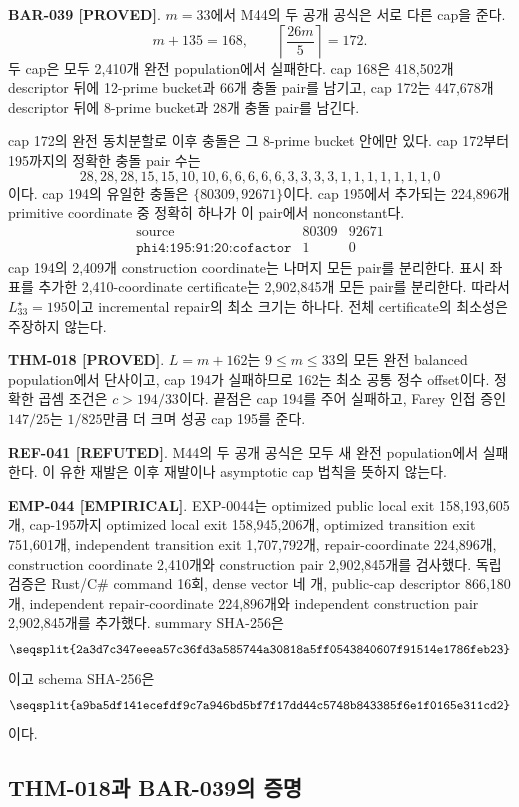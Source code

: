 \documentclass[11pt]{article}
\newcommand{\claimstatus}[2]{\textbf{#1 [#2]}}
\begin{document}
\claimstatus{BAR-039}{PROVED}.
\(m=33\)에서 M44의 두 공개 공식은 서로 다른 cap을 준다.
\[
m+135=168,\qquad
\left\lceil\frac{26m}{5}\right\rceil=172.
\]
두 cap은 모두 2,410개 완전 population에서 실패한다. cap 168은
418,502개 descriptor 뒤에 12-prime bucket과 66개 충돌 pair를
남기고, cap 172는 447,678개 descriptor 뒤에 8-prime bucket과
28개 충돌 pair를 남긴다.

cap 172의 완전 동치분할로 이후 충돌은 그 8-prime bucket 안에만
있다. cap 172부터 195까지의 정확한 충돌 pair 수는
\[
28,28,28,15,15,10,10,6,6,6,6,6,3,3,3,3,1,1,1,1,1,1,1,0
\]
이다. cap 194의 유일한 충돌은 \(\{80309,92671\}\)이다. cap 195에서
추가되는 224,896개 primitive coordinate 중 정확히 하나가 이 pair에서
nonconstant다.
\[
\begin{array}{c|rr}
\text{source}&80309&92671\\
\hline
\texttt{phi4:195:91:20:cofactor}&1&0
\end{array}
\]
cap 194의 2,409개 construction coordinate는 나머지 모든 pair를
분리한다. 표시 좌표를 추가한 2,410-coordinate certificate는
2,902,845개 모든 pair를 분리한다. 따라서
\(L_{33}^{\star}=195\)이고 incremental repair의 최소 크기는 하나다.
전체 certificate의 최소성은 주장하지 않는다.

\claimstatus{THM-018}{PROVED}.
\(L=m+162\)는 \(9\le m\le33\)의 모든 완전 balanced population에서
단사이고, cap 194가 실패하므로 162는 최소 공통 정수 offset이다.
정확한 곱셈 조건은 \(c>194/33\)이다. 끝점은 cap 194를 주어 실패하고,
Farey 인접 증인 \(147/25\)는 \(1/825\)만큼 더 크며 성공 cap 195를 준다.

\claimstatus{REF-041}{REFUTED}.
M44의 두 공개 공식은 모두 새 완전 population에서 실패한다. 이 유한
재발은 이후 재발이나 asymptotic cap 법칙을 뜻하지 않는다.

\claimstatus{EMP-044}{EMPIRICAL}.
EXP-0044는 optimized public local exit 158,193,605개, cap-195까지
optimized local exit 158,945,206개, optimized transition exit
751,601개, independent transition exit 1,707,792개,
repair-coordinate 224,896개, construction coordinate 2,410개와
construction pair 2,902,845개를 검사했다. 독립 검증은 Rust/C\#
command 16회, dense vector 네 개, public-cap descriptor 866,180개,
independent repair-coordinate 224,896개와 independent construction
pair 2,902,845개를 추가했다. summary SHA-256은
\[
\texttt{\seqsplit{2a3d7c347eeea57c36fd3a585744a30818a5ff0543840607f91514e1786feb23}}
\]
이고 schema SHA-256은
\[
\texttt{\seqsplit{a9ba5df141ecefdf9c7a946bd5bf7f17dd44c5748b843385f6e1f0165e311cd2}}
\]
이다.

\subsection{THM-018과 BAR-039의 증명}
\end{document}
